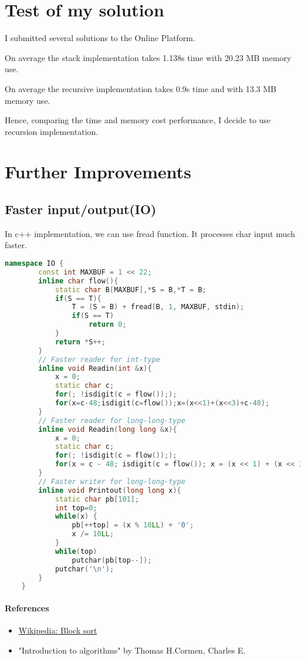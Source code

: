 \documentclass{report}
\begin{document}
\section{Test of my solution}

I submitted several solutions to the Online Platform.

\noindent
On average the stack implementation takes 1.138s time with 20.23 MB memory use.

\noindent
On average the recursive implementation takes 0.9s time and with 13.3 MB memory use.

\noindent
Hence, comparing the time and memory cost performance, I decide to use recursion implementation.

\section{Further Improvements}

\subsection{Faster input/output(IO)}

In c++ implementation, we can use fread function.
It processes char input much faster.

\begin{lstlisting}[language=C++, caption={Problem 2 Faster IO}]
    namespace IO {
        const int MAXBUF = 1 << 22;
        inline char flow(){
            static char B[MAXBUF],*S = B,*T = B;
            if(S == T){
                T = (S = B) + fread(B, 1, MAXBUF, stdin);
                if(S == T)
                    return 0;
            }
            return *S++;
        }
        // Faster reader for int-type
        inline void Readin(int &x){
            x = 0;
            static char c;
            for(; !isdigit(c = flow()););
            for(x=c-48;isdigit(c=flow());x=(x<<1)+(x<<3)+c-48);
        }
        // Faster reader for long-long-type
        inline void Readin(long long &x){
            x = 0;
            static char c;
            for(; !isdigit(c = flow()););
            for(x = c - 48; isdigit(c = flow()); x = (x << 1) + (x << 3) + c - 48);
        }
        // Faster writer for long-long-type
        inline void Printout(long long x){
            static char pb[101];
            int top=0;
            while(x) {
                pb[++top] = (x % 10LL) + '0';
                x /= 10LL;
            }
            while(top)
                putchar(pb[top--]);
            putchar('\n');
        }
    }
\end{lstlisting}

\paragraph{References}

\begin{itemize}
    \item \href{https://en.wikipedia.org/wiki/Block_sort#Algorithm}{Wikipedia: Block sort}
    \item "Introduction to algorithms" by Thomas H.Cormen, Charles E.
\end{itemize}
\end{document}
